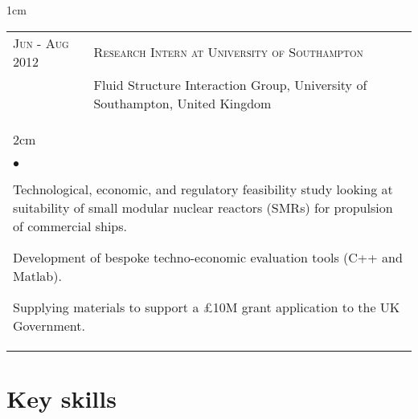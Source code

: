\documentclass[a4paper,10pt]{article}
\newcommand{\squishlist}{
	\begin{list}{$\bullet$}
	{
		\setlength{\itemsep}{0pt}
		\setlength{\parsep}{0pt}
		\setlength{\topsep}{0pt}
		\setlength{\partopsep}{0pt}
		\setlength{\leftmargin}{2em}
		\setlength{\labelwidth}{1.5em}
		\setlength{\labelsep}{0.5em}
	}
}
\newcommand{\squishend}{\end{list}}
\begin{document}
\begin{minipage}{\textwidth}
\begin{adjustwidth}{}{1cm}
\begin{tabular}{p{3.5cm} p{12.9cm}}
\textsc{Jun - Aug 2012} & \textsc{Research Intern at University of Southampton} \\
						& Fluid Structure Interaction Group, University of Southampton, United Kingdom \vspace{0.1cm} \\
%
\multicolumn{2}{l}{
\hspace{1cm}\begin{minipage}[t]{\textwidth}
\begin{adjustwidth}{}{2cm}
\squishlist
	\item Technological, economic, and regulatory feasibility study looking at suitability of
		small modular nuclear reactors (SMRs) for propulsion of commercial ships.
	\item Development of bespoke techno-economic evaluation tools (C++ and Matlab).
	\item Supplying materials to support a \pounds10M grant application to the UK Government.
\squishend
\end{adjustwidth}
\end{minipage}
} \\

\end{tabular}

\end{adjustwidth}
\end{minipage}


\section{Key skills}
\end{document}

